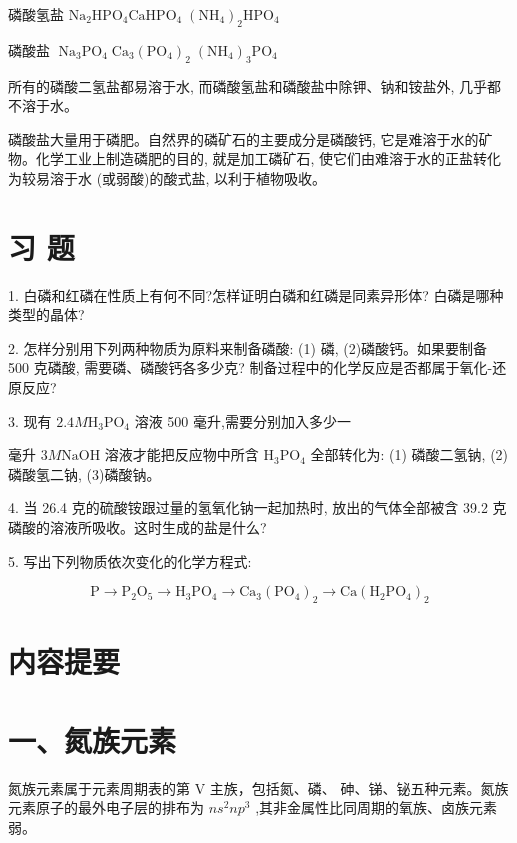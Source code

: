 \documentclass[10pt]{article}
\begin{document}
磷酸氢盐 \({\mathrm{{Na}}}_{2}{\mathrm{{HPO}}}_{4}{\mathrm{{CaHPO}}}_{4}\;{\left( {\mathrm{{NH}}}_{4}\right) }_{2}{\mathrm{{HPO}}}_{4}\)

磷酸盐 \(\;{\mathrm{{Na}}}_{3}{\mathrm{{PO}}}_{4}\;{\mathrm{{Ca}}}_{3}{\left( {\mathrm{{PO}}}_{4}\right) }_{2}\;{\left( {\mathrm{{NH}}}_{4}\right) }_{3}{\mathrm{{PO}}}_{4}\)

所有的磷酸二氢盐都易溶于水, 而磷酸氢盐和磷酸盐中除钾、钠和铵盐外, 几乎都不溶于水。

磷酸盐大量用于磷肥。自然界的磷矿石的主要成分是磷酸钙, 它是难溶于水的矿物。化学工业上制造磷肥的目的, 就是加工磷矿石, 使它们由难溶于水的正盐转化为较易溶于水 (或弱酸)的酸式盐, 以利于植物吸收。

\section*{习 题}

1. 白磷和红磷在性质上有何不同?怎样证明白磷和红磷是同素异形体? 白磷是哪种类型的晶体?

2. 怎样分别用下列两种物质为原料来制备磷酸: (1) 磷, (2)磷酸钙。如果要制备 500 克磷酸, 需要磷、磷酸钙各多少克? 制备过程中的化学反应是否都属于氧化-还原反应?

3. 现有 \({2.4M}{\mathrm{H}}_{3}{\mathrm{{PO}}}_{4}\) 溶液 500 毫升,需要分别加入多少一

毫升 \({3M}\mathrm{{NaOH}}\) 溶液才能把反应物中所含 \({\mathrm{H}}_{3}{\mathrm{{PO}}}_{4}\) 全部转化为: (1) 磷酸二氢钠, (2)磷酸氢二钠, (3)磷酸钠。

4. 当 26.4 克的硫酸铵跟过量的氢氧化钠一起加热时, 放出的气体全部被含 39.2 克磷酸的溶液所吸收。这时生成的盐是什么?

5. 写出下列物质依次变化的化学方程式:

\[
\mathrm{P} \rightarrow {\mathrm{P}}_{2}{\mathrm{O}}_{5} \rightarrow {\mathrm{H}}_{3}{\mathrm{{PO}}}_{4} \rightarrow {\mathrm{{Ca}}}_{3}{\left( {\mathrm{{PO}}}_{4}\right) }_{2} \rightarrow \mathrm{{Ca}}{\left( {\mathrm{H}}_{2}{\mathrm{{PO}}}_{4}\right) }_{2}
\]

\section*{内容提要}

\section*{一、氮族元素}

氮族元素属于元素周期表的第 \(\mathrm{V}\) 主族，包括氮、磷、 砷、锑、铋五种元素。氮族元素原子的最外电子层的排布为 \(n{s}^{2}n{p}^{3}\) ,其非金属性比同周期的氧族、卤族元素弱。
\end{document}
